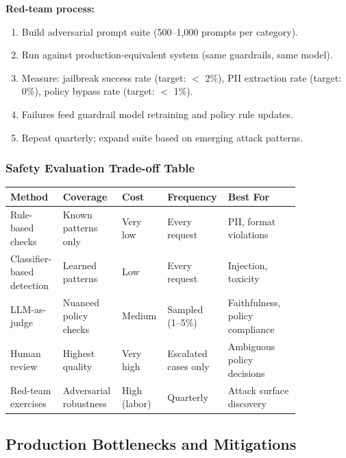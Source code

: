 \textbf{Red-team process:}

\begin{enumerate}
  \item Build adversarial prompt suite (500--1,000 prompts per category).
  \item Run against production-equivalent system (same guardrails, same model).
  \item Measure: jailbreak success rate (target: $<$ 2\%), PII extraction rate (target: 0\%), policy bypass rate (target: $<$ 1\%).
  \item Failures feed guardrail model retraining and policy rule updates.
  \item Repeat quarterly; expand suite based on emerging attack patterns.
\end{enumerate}

\subsubsection*{Safety Evaluation Trade-off Table}

\small
\begin{tabular}{|p{0.16\linewidth}|p{0.18\linewidth}|p{0.12\linewidth}|p{0.14\linewidth}|p{0.24\linewidth}|}
\hline
\textbf{Method} & \textbf{Coverage} & \textbf{Cost} & \textbf{Frequency} & \textbf{Best For} \\
\hline
Rule-based checks & Known patterns only & Very low & Every request & PII, format violations \\
\hline
Classifier-based detection & Learned patterns & Low & Every request & Injection, toxicity \\
\hline
LLM-as-judge & Nuanced policy checks & Medium & Sampled (1--5\%) & Faithfulness, policy compliance \\
\hline
Human review & Highest quality & Very high & Escalated cases only & Ambiguous policy decisions \\
\hline
Red-team exercises & Adversarial robustness & High (labor) & Quarterly & Attack surface discovery \\
\hline
\end{tabular}
\normalsize

\subsection*{Production Bottlenecks and Mitigations}

